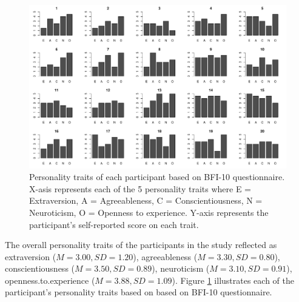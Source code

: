     \begin{figure}
        \centering
        \includegraphics[clip, trim=0cm 0cm 0.25cm 0cm, width=\textwidth]{figures/personality.pdf}
        \caption{Personality traits of each participant based on \ac{BFI-10} questionnaire. X-asis represents each of the 5 personality traits where E = Extraversion, A = Agreeableness, C = Conscientiousness, N = Neuroticism, O = Openness to experience. Y-axis represents the participant's self-reported score on each trait.}
        \label{fig:personality}
    \end{figure}
     
    The overall personality traits of the participants in the study reflected as 
        extraversion    ($ M = 3.00, SD = 1.20 $),  
        agreeableness   ($ M = 3.30, SD = 0.80 $),    
        conscientiousness   ($ M = 3.50, SD = 0.89 $),    
        neuroticism ($ M = 3.10, SD = 0.91 $), 
        openness.to.experience  ($ M = 3.88, SD = 1.09 $).
    Figure \ref{fig:personality} illustrates each of the participant's personality traits based on based on \ac{BFI-10} questionnaire.


